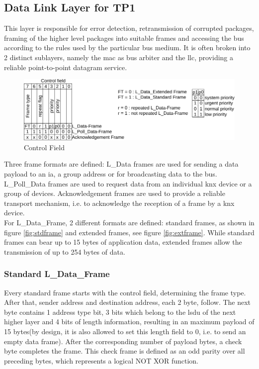 \subsection{Data Link Layer for TP1}

This layer is responsible for error detection, retransmission of corrupted 
packages, framing of the higher level packages into suitable frames and accessing the bus according to the rules used by the particular bus medium. 
It is often broken into 2 distinct sublayers, namely the \gls{mac} as bus arbiter and the \gls{llc}, providing a reliable point-to-point datagram service.
\begin{figure}
    \centering
    \includegraphics[width=1\textwidth]{figures/ctrl}
    \caption{Control Field}
    \label{fig:ctrlfield}
\end{figure}
Three frame formats are defined: L\_Data frames are used for sending a data payload to an \gls{ia}, a group address or for broadcasting data to
the bus. L\_Poll\_Data frames are used to request data from an individual knx device or a group of devices. Acknowledgement frames are used to provide a reliable
transport mechanism, i.e. to acknowledge the reception of a frame by a knx device. 
\\
For L\_Data\_Frame, 2 different formats are defined: standard frames, as shown in figure \ref{fig:stdframe} and extended frames, see figure \ref{fig:extframe}.
While standard frames can bear up to
15 bytes of application data, extended frames allow the transmission of up to 254 bytes of data.

\subsubsection{Standard L\_Data\_Frame}

Every standard frame starts with the control field, determining the frame type. 
After that, sender address and destination address, each 2 byte, follow.
The next byte contains 1 address type bit, 3 bits which belong to the \gls{lsdu} of the next higher layer
and 4 bits of length information, resulting in an maximum payload of 15 bytes(by design, it is also allowed to set this length
field to 0, i.e. to send an empty data frame). After the corresponding number of payload bytes, a check byte completes the frame. This check
frame is defined as an odd parity over all preceding bytes, which represents a logical NOT XOR function. 


